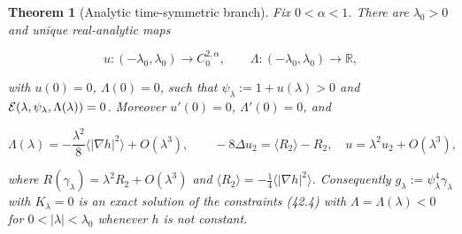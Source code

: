 \documentclass[11pt]{article}
\newtheorem{theorem}{Theorem}[section]
\theoremstyle{remark}
\begin{document}
\begin{theorem}[Analytic time-symmetric branch]
\label{thm:v19v41-branch}
Fix \(0<\alpha<1\).  There are \(\lambda_0>0\) and unique real-analytic
maps

\[
 u:(-\lambda_0,\lambda_0)\to C^{2,\alpha}_0,\qquad
 \Lambda:(-\lambda_0,\lambda_0)\to\mathbb R,                          \tag{44.3}
\]

with \(u(0)=0\), \(\Lambda(0)=0\), such that
\(\psi_\lambda:=1+u(\lambda)>0\) and
\({\cal E}(\lambda,\psi_\lambda,\Lambda(\lambda))=0\).  Moreover
\(u'(0)=0\), \(\Lambda'(0)=0\), and

\[
 \Lambda(\lambda)=-\frac{\lambda^2}8\bigl\langle|\nabla h|^2\bigr\rangle
 +O(\lambda^3),
 \qquad
 -8\Delta u_2=\langle R_2\rangle-R_2,\quad u=\lambda^2u_2+O(\lambda^3),
                                                                    \tag{44.4}
\]

where \(R(\gamma_\lambda)=\lambda^2R_2+O(\lambda^3)\) and
\(\langle R_2\rangle=-\tfrac14\langle|\nabla h|^2\rangle\).
Consequently \(g_\lambda:=\psi_\lambda^4\gamma_\lambda\) with
\(K_\lambda=0\) is an exact solution of the constraints (42.4) with
\(\Lambda=\Lambda(\lambda)<0\) for \(0<|\lambda|<\lambda_0\) whenever
\(h\) is not constant.
\end{theorem}
\end{document}
